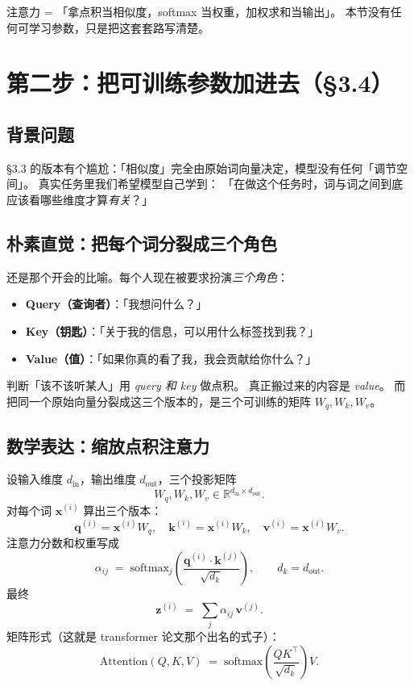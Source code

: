 \documentclass[11pt,a4paper]{ctexart}
\newcommand{\vect}[1]{\boldsymbol{#1}}
\begin{document}
\begin{keypointblock}
注意力 = 「拿点积当相似度，softmax 当权重，加权求和当输出」。
本节没有任何可学习参数，只是把这套套路写清楚。
\end{keypointblock}

\section{第二步：把可训练参数加进去（§3.4）}

\subsection{背景问题}

§3.3 的版本有个尴尬：「相似度」完全由原始词向量决定，模型没有任何「调节空间」。
真实任务里我们希望模型自己学到：
「在做这个任务时，词与词之间到底应该看哪些维度才算\emph{有关}？」

\subsection{朴素直觉：把每个词分裂成三个角色}

\begin{intuitionblock}
还是那个开会的比喻。每个人现在被要求扮演\emph{三个角色}：

\begin{itemize}
  \item \textbf{Query（查询者）}：「我想问什么？」
  \item \textbf{Key（钥匙）}：「关于我的信息，可以用什么标签找到我？」
  \item \textbf{Value（值）}：「如果你真的看了我，我会贡献给你什么？」
\end{itemize}

判断「该不该听某人」用 \emph{query 和 key} 做点积。
真正搬过来的内容是 \emph{value}。
而把同一个原始向量分裂成这三个版本的，是三个可训练的矩阵 $W_q, W_k, W_v$。
\end{intuitionblock}

\subsection{数学表达：缩放点积注意力}

设输入维度 $d_{\text{in}}$，输出维度 $d_{\text{out}}$，三个投影矩阵
\[
  W_q, W_k, W_v \in \mathbb{R}^{d_{\text{in}} \times d_{\text{out}}}.
\]
对每个词 $\vect{x}^{(i)}$ 算出三个版本：
\[
  \vect{q}^{(i)} = \vect{x}^{(i)} W_q,\quad
  \vect{k}^{(i)} = \vect{x}^{(i)} W_k,\quad
  \vect{v}^{(i)} = \vect{x}^{(i)} W_v.
\]
注意力分数和权重写成
\[
  \alpha_{ij} \;=\; \mathrm{softmax}_j\!\left(\frac{\vect{q}^{(i)} \cdot \vect{k}^{(j)}}{\sqrt{d_k}}\right),
  \qquad d_k = d_{\text{out}}.
\]
最终
\[
  \vect{z}^{(i)} \;=\; \sum_j \alpha_{ij}\, \vect{v}^{(j)}.
\]
矩阵形式（这就是 transformer 论文那个出名的式子）：
\[
  \boxed{\;
  \mathrm{Attention}(Q, K, V) \;=\; \mathrm{softmax}\!\left(\frac{QK^\top}{\sqrt{d_k}}\right) V.
  \;}
\]
\end{document}

